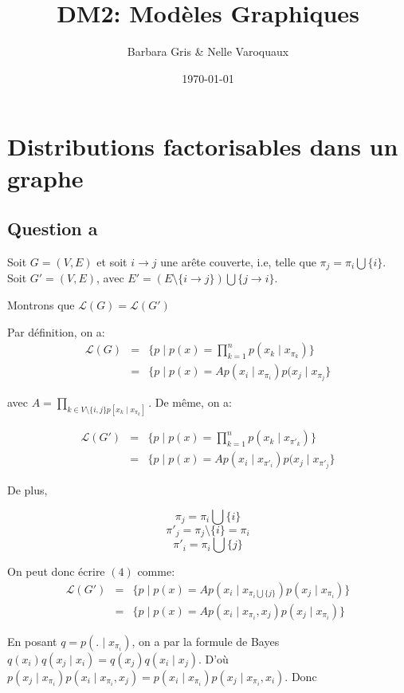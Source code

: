 \documentclass{article}
\date{\today}
\title{DM2: Modèles Graphiques}
\author{Barbara Gris \& Nelle Varoquaux}
\begin{document}
\maketitle
\tableofcontents{}
\vfill \eject

\section{Distributions factorisables dans un graphe}
\subsection{Question a}

Soit $G = (V, E)$ et soit $i \rightarrow j$ une arête couverte, i.e, telle que
$\pi_j = \pi_i \bigcup \{i\}$.
Soit $G'= (V,E)$, avec $E' = (E \setminus \{i \rightarrow j\}) \bigcup \{j \rightarrow i\}$.

Montrons que $\mathcal{L}(G) = \mathcal{L}(G')$


Par définition, on a:
\begin{align}
\mathcal{L}(G) & = & \{ p \mid p(x) = \prod_{k = 1}^{n} p(x_k \mid x_{\pi_k}) \} \\
	       & = & \{ p \mid p(x) = A p(x_i \mid x_{\pi_i}) p(x_j \mid x_{\pi_j} \}
\end{align}

avec $A = \prod_{k \in V \setminus \{i, j\} p[x_k \mid x_{\pi_k}]}$. De même, on a:

\begin{align}
\mathcal{L}(G') & = & \{ p \mid p(x) = \prod_{k = 1}^{n} p(x_k \mid x_{\pi'_k}) \} \\
		& = & \{ p \mid p(x) = A p(x_i \mid x_{\pi'_i}) p(x_j \mid x_{\pi'_j} \}
\end{align}

De plus,

$$\pi_j = \pi_i \bigcup \{ i \}$$
$$\pi'_j = \pi_j \setminus \{ i \} = \pi_i$$
$$\pi'_i = \pi_i \bigcup \{ j \}$$

On peut donc écrire $(4)$ comme:
\begin{align}
\mathcal{L}(G') & = & \{ p \mid p(x) = A p(x_i \mid x_{\pi_i \bigcup \{ j \}}) p(x_j \mid x_{\pi_i} )\} \\
		& = & \{ p \mid p(x) = A p(x_i \mid x_{\pi_i}, x_j) p(x_j \mid x_{\pi_i})\}
\end{align}

En posant $q = p(. \mid x_{\pi_i})$, on a par la formule de Bayes $q(x_i)q(x_j \mid x_i) =  q(x_j)q(x_i \mid x_j)$.
D'où $p(x_j \mid x_{\pi_i})p(x_i \mid x_{\pi_i}, x_j) = p(x_i \mid x_{\pi_i})p(x_j \mid x_{\pi_i}, x_i)$. Donc
\end{document}
